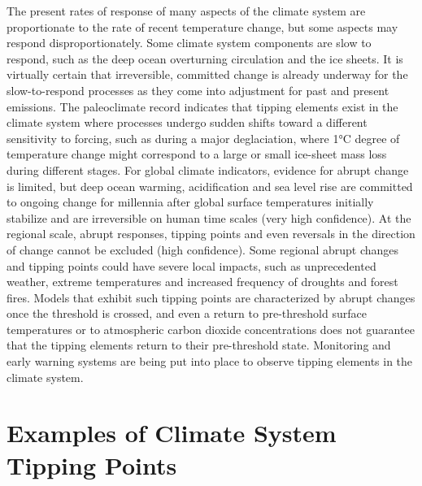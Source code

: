 The present rates of response of many aspects of the climate system are proportionate to the rate of recent temperature change, but some aspects may respond disproportionately. Some climate system components are slow to respond, such as the deep ocean overturning circulation and the ice sheets. It is virtually certain that irreversible, committed change is already underway for the slow-to-respond processes as they come into adjustment for past and present emissions. The paleoclimate record indicates that tipping elements exist in the climate system where processes undergo sudden shifts toward a different sensitivity to forcing, such as during a major deglaciation, where 1°C degree of temperature change might correspond to a large or small ice-sheet mass loss during different stages. For global climate indicators, evidence for abrupt change is limited, but deep ocean warming, acidification and sea level rise are committed to ongoing change for millennia after global surface temperatures initially stabilize and are irreversible on human time scales (very high confidence). At the regional scale, abrupt responses, tipping points and even reversals in the direction of change cannot be excluded (high confidence). Some regional abrupt changes and tipping points could have severe local impacts, such as unprecedented weather, extreme temperatures and increased frequency of droughts and forest fires. Models that exhibit such tipping points are characterized by abrupt changes once the threshold is crossed, and even a return to pre-threshold surface temperatures or to atmospheric carbon dioxide concentrations does not guarantee that the tipping elements return to their pre-threshold state. Monitoring and early warning systems are being put into place to observe tipping elements in the climate system.






\section{Examples of Climate System Tipping Points}


